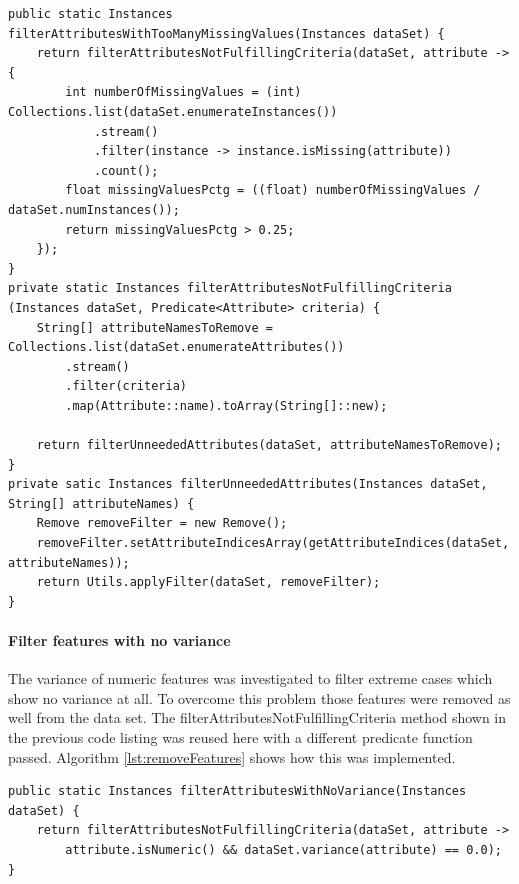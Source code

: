 \begin{lstlisting}[caption={Remove unneeded features}, label={lst:unneededFeatures}]
public static Instances filterAttributesWithTooManyMissingValues(Instances dataSet) {
	return filterAttributesNotFulfillingCriteria(dataSet, attribute -> {
		int numberOfMissingValues = (int) Collections.list(dataSet.enumerateInstances())
			.stream()
			.filter(instance -> instance.isMissing(attribute))
			.count();
		float missingValuesPctg = ((float) numberOfMissingValues / dataSet.numInstances());
		return missingValuesPctg > 0.25;
	});
}
private static Instances filterAttributesNotFulfillingCriteria
(Instances dataSet, Predicate<Attribute> criteria) {
	String[] attributeNamesToRemove = Collections.list(dataSet.enumerateAttributes())
		.stream()
		.filter(criteria)
		.map(Attribute::name).toArray(String[]::new);
		
	return filterUnneededAttributes(dataSet, attributeNamesToRemove);
}
private satic Instances filterUnneededAttributes(Instances dataSet, String[] attributeNames) {
	Remove removeFilter = new Remove();
	removeFilter.setAttributeIndicesArray(getAttributeIndices(dataSet, attributeNames));
	return Utils.applyFilter(dataSet, removeFilter);
}
\end{lstlisting}

\paragraph{Filter features with no variance}
The variance of numeric features was investigated to filter extreme cases which show no variance at all. To overcome this problem those features were removed as well from the data set. The filterAttributesNotFulfillingCriteria method shown in the previous code listing was reused here with a different predicate function passed. Algorithm \ref{lst:removeFeatures} shows how this was implemented.

\begin{lstlisting}[caption={Remove features}, label={lst:removeFeatures}]
public static Instances filterAttributesWithNoVariance(Instances dataSet) {
	return filterAttributesNotFulfillingCriteria(dataSet, attribute ->
		attribute.isNumeric() && dataSet.variance(attribute) == 0.0);
}
\end{lstlisting}

